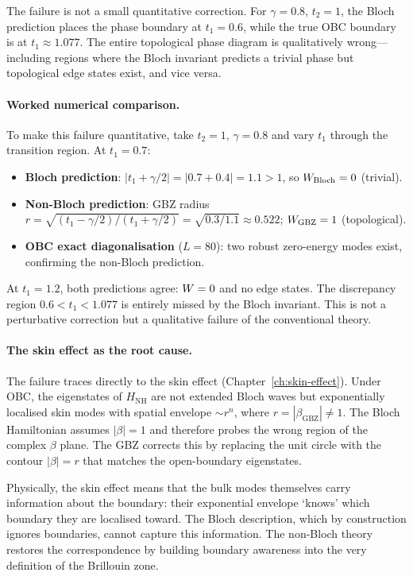 \begin{booknote}
The failure is not a small quantitative correction. For $\gamma = 0.8$,
$t_2 = 1$, the Bloch prediction places the phase boundary at
$t_1 = 0.6$, while the true OBC boundary is at $t_1 \approx 1.077$.
The entire topological phase diagram is qualitatively wrong---including
regions where the Bloch invariant predicts a trivial phase but topological
edge states exist, and vice versa.
\end{booknote}

\paragraph{Worked numerical comparison.}
To make this failure quantitative, take $t_2 = 1$, $\gamma = 0.8$
and vary $t_1$ through the transition region. At $t_1 = 0.7$:
\begin{itemize}
 \item \textbf{Bloch prediction}: $|t_1 + \gamma/2| = |0.7 + 0.4| = 1.1 > 1$,
 so $W_{\text{Bloch}} = 0$ (trivial).
 \item \textbf{Non-Bloch prediction}: GBZ radius
 $r = \sqrt{(t_1 - \gamma/2)/(t_1 + \gamma/2)} = \sqrt{0.3/1.1} \approx 0.522$;
 $W_{\text{GBZ}} = 1$ (topological).
 \item \textbf{OBC exact diagonalisation} ($L = 80$): two robust
 zero-energy modes exist, confirming the non-Bloch prediction.
\end{itemize}
At $t_1 = 1.2$, both predictions agree: $W = 0$ and no edge states.
The discrepancy region $0.6 < t_1 < 1.077$ is entirely missed by the
Bloch invariant. This is not a perturbative correction but a qualitative
failure of the conventional theory.

\paragraph{The skin effect as the root cause.}
The failure traces directly to the skin effect
(Chapter~\ref{ch:skin-effect}). Under OBC, the eigenstates of
$H_{\mathrm{NH}}$ are not extended Bloch waves but exponentially
localised skin modes with spatial envelope $\sim r^n$, where
$r = |\beta_{\mathrm{GBZ}}| \neq 1$. The Bloch Hamiltonian assumes
$|\beta| = 1$ and therefore probes the wrong region of the complex
$\beta$ plane. The GBZ corrects this by replacing the unit circle
with the contour $|\beta| = r$ that matches the open-boundary
eigenstates.

Physically, the skin effect means that the bulk modes themselves
carry information about the boundary: their exponential envelope
`knows' which boundary they are localised toward. The Bloch
description, which by construction ignores boundaries, cannot capture
this information. The non-Bloch theory restores the correspondence
by building boundary awareness into the very definition of the
Brillouin zone.

